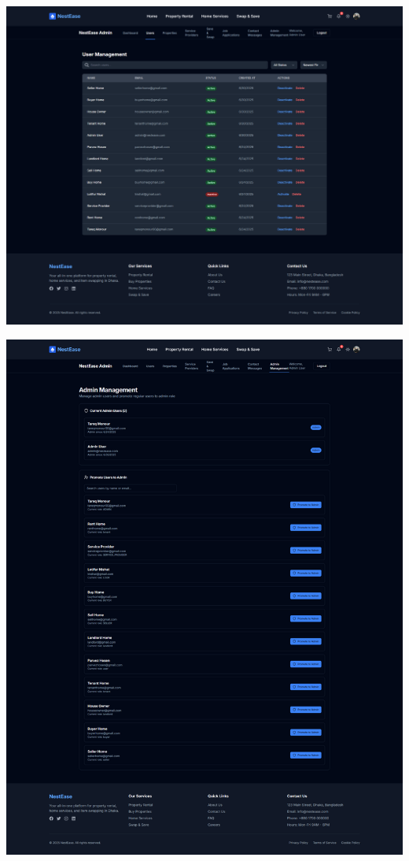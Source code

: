 \documentclass[conference]{IEEEtran}
\begin{document}
\begin{center}
\noindent
\begin{minipage}[t]{0.45\textwidth}
\includegraphics[width=\linewidth]{Project Screenshot/Admin- Users.png}
\end{minipage} \hfill
\begin{minipage}[t]{0.45\textwidth}
\includegraphics[width=\linewidth]{Project Screenshot/Admin Management.png}
\end{minipage}


\end{center}
\end{document}
